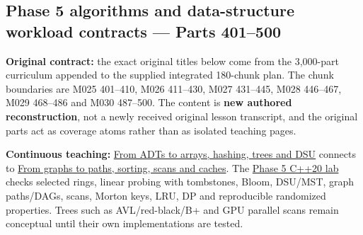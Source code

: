 \subsection{Phase 5 algorithms and data-structure workload contracts --- Parts 401--500}\label{phase-5-algorithms-and-data-structure-workload-contracts-parts-401500}

\textbf{Original contract:} the exact original titles below come from the 3,000-part curriculum appended to the supplied integrated 180-chunk plan. The chunk boundaries are M025 401--410, M026 411--430, M027 431--445, M028 446--467, M029 468--486 and M030 487--500. The content is \textbf{new authored reconstruction}, not a newly received original lesson transcript, and the original parts act as coverage atoms rather than as isolated teaching pages.

\textbf{Continuous teaching:} \href{Continuous\%20Notes/Computing\%20Foundations\%20-\%20From\%20Bits\%20to\%20C++\%20and\%20Systems\%20APIs\#The\%20scene\%20is\%20now\%20too\%20large\%20for\%20the\%20wrong\%20container\%20—\%20Phase\%205,\%20M025–M027,\%20Parts\%20401–445}{From ADTs to arrays, hashing, trees and DSU} connects to \href{Continuous\%20Notes/Computing\%20Foundations\%20-\%20From\%20Bits\%20to\%20C++\%20and\%20Systems\%20APIs\#From\%20an\%20asset\%20map\%20to\%20a\%20correct\%20navigable\%20world\%20—\%20Phase\%205,\%20M028–M030,\%20Parts\%20446–500}{From graphs to paths, sorting, scans and caches}. The \href{tools/labs/phase5_algorithm_workload_lab.cpp}{Phase 5 C++20 lab} checks selected rings, linear probing with tombstones, Bloom, DSU/MST, graph paths/DAGs, scans, Morton keys, LRU, DP and reproducible randomized properties. Trees such as AVL/red-black/B+ and GPU parallel scans remain conceptual until their own implementations are tested.

